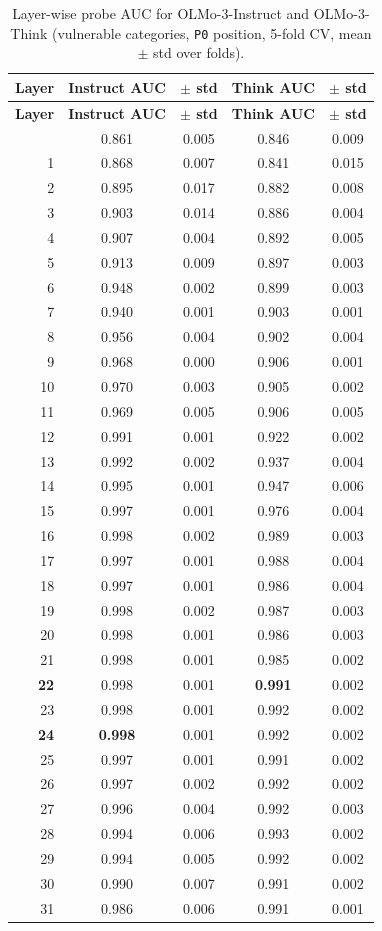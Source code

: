 \documentclass{article}
\newcommand{\pzero}{\texttt{P0}}
\begin{document}
\begin{longtable}{rcccc}
\caption{Layer-wise probe AUC for OLMo-3-Instruct and OLMo-3-Think
  (vulnerable categories, \pzero{} position, 5-fold CV,
  mean $\pm$ std over folds).}
\label{tab:olmo_probe_layers} \\
\toprule
\textbf{Layer} & \textbf{Instruct AUC} & \textbf{$\pm$ std} & \textbf{Think AUC} & \textbf{$\pm$ std} \\
\midrule
\endfirsthead
\toprule
\textbf{Layer} & \textbf{Instruct AUC} & \textbf{$\pm$ std} & \textbf{Think AUC} & \textbf{$\pm$ std} \\
\midrule
\endhead
\bottomrule
\endfoot
 0 & 0.861 & 0.005 & 0.846 & 0.009 \\
 1 & 0.868 & 0.007 & 0.841 & 0.015 \\
 2 & 0.895 & 0.017 & 0.882 & 0.008 \\
 3 & 0.903 & 0.014 & 0.886 & 0.004 \\
 4 & 0.907 & 0.004 & 0.892 & 0.005 \\
 5 & 0.913 & 0.009 & 0.897 & 0.003 \\
 6 & 0.948 & 0.002 & 0.899 & 0.003 \\
 7 & 0.940 & 0.001 & 0.903 & 0.001 \\
 8 & 0.956 & 0.004 & 0.902 & 0.004 \\
 9 & 0.968 & 0.000 & 0.906 & 0.001 \\
10 & 0.970 & 0.003 & 0.905 & 0.002 \\
11 & 0.969 & 0.005 & 0.906 & 0.005 \\
12 & 0.991 & 0.001 & 0.922 & 0.002 \\
13 & 0.992 & 0.002 & 0.937 & 0.004 \\
14 & 0.995 & 0.001 & 0.947 & 0.006 \\
15 & 0.997 & 0.001 & 0.976 & 0.004 \\
16 & 0.998 & 0.002 & 0.989 & 0.003 \\
17 & 0.997 & 0.001 & 0.988 & 0.004 \\
18 & 0.997 & 0.001 & 0.986 & 0.004 \\
19 & 0.998 & 0.002 & 0.987 & 0.003 \\
20 & 0.998 & 0.001 & 0.986 & 0.003 \\
21 & 0.998 & 0.001 & 0.985 & 0.002 \\
\textbf{22} & 0.998 & 0.001 & \textbf{0.991} & 0.002 \\
23 & 0.998 & 0.001 & 0.992 & 0.002 \\
\textbf{24} & \textbf{0.998} & 0.001 & 0.992 & 0.002 \\
25 & 0.997 & 0.001 & 0.991 & 0.002 \\
26 & 0.997 & 0.002 & 0.992 & 0.002 \\
27 & 0.996 & 0.004 & 0.992 & 0.003 \\
28 & 0.994 & 0.006 & 0.993 & 0.002 \\
29 & 0.994 & 0.005 & 0.992 & 0.002 \\
30 & 0.990 & 0.007 & 0.991 & 0.002 \\
31 & 0.986 & 0.006 & 0.991 & 0.001 \\
\end{longtable}
\end{document}
